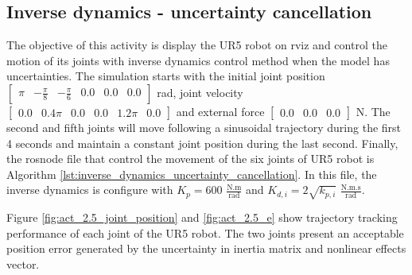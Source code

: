 \subsection{Inverse dynamics - uncertainty cancellation}
The objective of this activity is display the UR5 robot on rviz and control the motion of its joints with inverse dynamics control method when the model has uncertainties. The simulation starts with the initial joint position $\begin{bmatrix} \pi & -\frac{\pi}{8} & -\frac{\pi}{6} & 0.0 & 0.0 & 0.0 \end{bmatrix}$ rad, joint velocity $\begin{bmatrix} 0.0 & 0.4\pi & 0.0 & 0.0 & 1.2\pi & 0.0 \end{bmatrix}$ and external force $\begin{bmatrix} 0.0 & 0.0 & 0.0 \end{bmatrix}$ N. The second and fifth joints will move following a sinusoidal trajectory during the first 4 seconds and maintain a constant joint position during the last second. Finally, the rosnode file that control the movement of the six joints of UR5 robot is Algorithm \ref{lst:inverse_dynamics_uncertainty_cancellation}. In this file, the inverse dynamics is configure with $K_p=600$ $\mathrm{\frac{N.m}{rad}}$ and $K_{d,i}=2\sqrt{k_{p,i}}$ $\mathrm{\frac{N.m.s}{rad}}$.

Figure \ref{fig:act_2.5_joint_position} and \ref{fig:act_2.5_e} show trajectory tracking performance of each joint of the UR5 robot. The two joints present an acceptable position error generated by the uncertainty in inertia matrix and nonlinear effects vector. 

